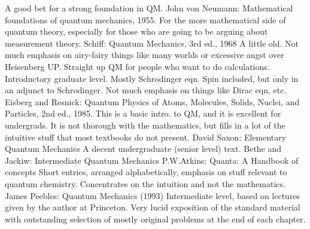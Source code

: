 \documentclass[10pt,a4paper]{book}
\theoremstyle{definition}
\begin{document}
A good bet for a strong foundation in QM.
John von Neumann: Mathematical foundations of quantum mechanics, 1955.
For the more mathematical side of quantum theory, especially for those who are going to be arguing about measurement theory.
Schiff: Quantum Mechanics, 3rd ed., 1968
A little old.  Not much emphasis on airy-fairy things like many worlds or excessive angst over Heisenberg UP.  Straight up QM for people who want to do calculations.  Introductory graduate level.  Mostly Schrodinger eqn.  Spin included, but only in an adjunct to Schrodinger.  Not much emphasis on things like Dirac eqn, etc.
Eisberg and Resnick: Quantum Physics of Atoms, Molecules, Solids, Nuclei, and Particles, 2nd ed., 1985.
This is a basic intro. to QM, and it is excellent for undergrads.  It is not thorough with the mathematics, but fills in a lot of the intuitive stuff that most textbooks do not present.
David Saxon: Elementary Quantum Mechanics
A decent undergraduate (senior level) text.
Bethe and Jackiw: Intermediate Quantum Mechanics
P.W.Atkins: Quanta: A Handbook of concepts
Short entries, arranged alphabetically, emphasis on stuff relevant to quantum chemistry.  Concentrates on the intuition and not the mathematics.
James Peebles: Quantum Mechanics (1993)
Intermediate level, based on lectures given by the author at Princeton.  Very lucid exposition of the standard material with outstanding selection of mostly original problems at the end of each chapter.
\end{document}
